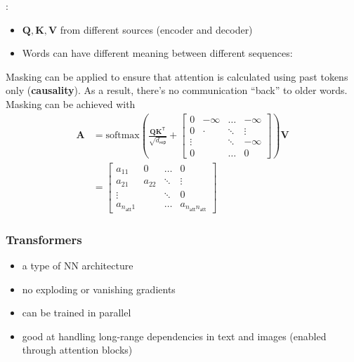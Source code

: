 \newpar{}
:

\begin{itemize}
    \item $\mathbf{Q,K,V}$ from different sources (encoder and decoder)
    \item Words can have different meaning between different sequences:
\end{itemize}

\newpar{}

Masking can be applied to ensure that attention is calculated using past tokens only (\textbf{causality}). As a result, there's no communication ``back'' to older words.
Masking can be achieved with
\noindent\begin{align*}
    \mathbf{A} & = \mathrm{softmax}\left(\frac{\mathbf{QK}^{\mathsf{T}}}{\sqrt{d_{\mathsf{rep}}}}+
    \begin{bmatrix}
        0      & -\infty & \hdots & -\infty \\
        0      & \cdot   & \ddots & \vdots  \\
        \vdots &         & \ddots & -\infty \\
        0      &         & \hdots & 0
    \end{bmatrix}
    \right)\mathbf{V}                                                                                                      \\
               & =  \begin{bmatrix}
                        a_{11}                & 0      & \hdots & 0                                    \\
                        a_{21}                & a_{22} & \ddots & \vdots                               \\
                        \vdots                &        & \ddots & 0                                    \\
                        a_{n_{\mathsf{att}}1} &        & \hdots & a_{n_{\mathsf{att}}n_{\mathsf{att}}}
                    \end{bmatrix}
\end{align*}

\subsubsection{Transformers}
\begin{itemize}
    \item a type of NN architecture
    \item no exploding or vanishing gradients
    \item can be trained in parallel
    \item good at handling long-range dependencies in text and images (enabled through attention blocks)
\end{itemize}
